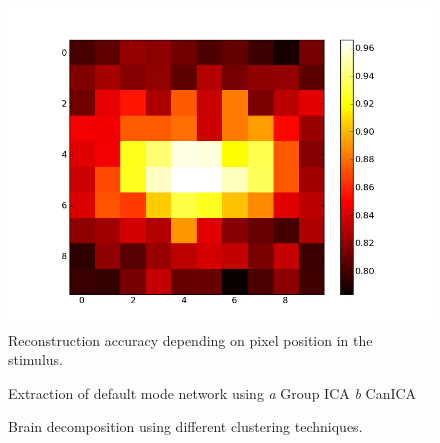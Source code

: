 \documentclass{frontiersSCNS} %
\begin{document}
\begin{figure}[h]
  \begin{center}
    \includegraphics[width=.3\linewidth]{img/logistic_l1_scores.png}
  \end{center}
  \caption{Reconstruction accuracy depending on pixel
           position in the stimulus.}
\label{fig:omp}
\end{figure}

\begin{figure}[h]
  \begin{center}
  \end{center}
  \caption{Extraction of default mode network using \textit{a} Group ICA
  \textit{b} CanICA}
  \label{fig:ica}
\end{figure}

\begin{figure}[h]
  \begin{center}
  \end{center}
  \caption{Brain decomposition using different clustering techniques.}
  \label{fig:clustering}
\end{figure}
\end{document}
